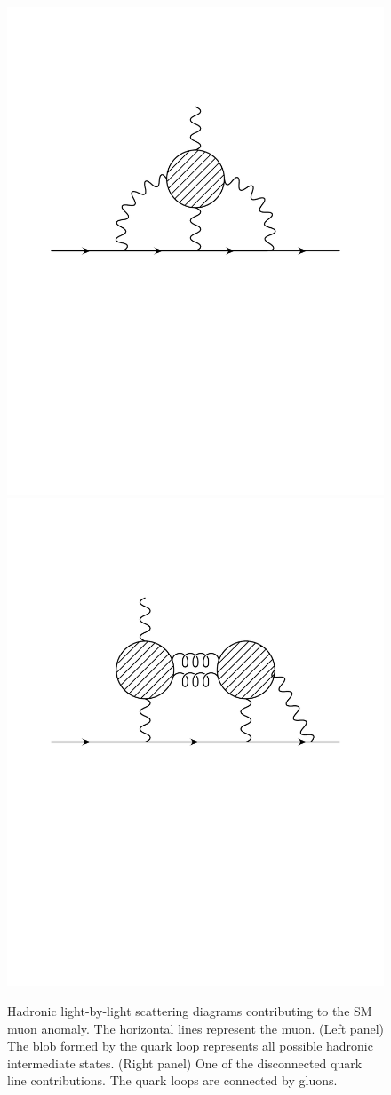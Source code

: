 \begin{figure}[bp]
    \centering
\vspace*{-2pt}
    \includegraphics[width=0.3\columnwidth]{ChargedLeptons/Figures/hlbl.pdf}\hskip 1cm
    \includegraphics[width=0.3\columnwidth]{ChargedLeptons/Figures/hlbl-disc.pdf}
    \caption{Hadronic light-by-light scattering diagrams contributing to the SM muon anomaly. The horizontal lines represent the muon. (Left panel) The blob formed by the quark loop represents all possible hadronic intermediate states.  (Right panel) One of the disconnected quark line contributions. The quark loops are connected by gluons.}
    \label{fig:hlbl}
\end{figure}
%


